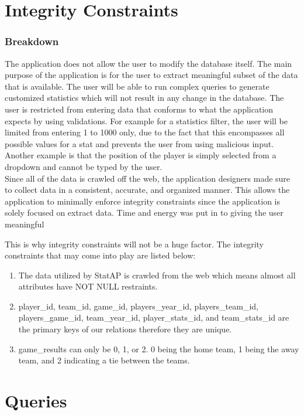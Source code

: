 \documentclass[12pt,letterpaper]{article}
\begin{document}
\section{Integrity Constraints}

\subsubsection{Breakdown}
The application does not allow the user to modify the database itself. The main purpose of the application is for the user to extract meaningful subset of the data that is available. The user will be able to run complex queries to generate customized statistics which will not result in any change in the database. The user is restricted from entering data that conforms to what the application expects by using validations. For example for a statistics filter, the user will be limited from entering 1 to 1000 only, due to the fact that this encompasses all possible values for a stat and prevents the user from using malicious input. Another example is that the position of the player is simply selected from a dropdown and cannot be typed by the user. \\

Since all of the data is crawled off the web, the application designers made sure to collect data in a consistent, accurate, and organized manner. This allows the application to minimally enforce integrity constraints since the application is solely focused on extract data. Time and energy was put in to giving the user meaningful 

This is why integrity constraints will not be a huge factor. The integrity constraints that may come into play are listed below:

\begin{enumerate}
\item The data utilized by StatAP is crawled from the web which means almost all attributes have NOT NULL restraints.
\item player\_id, team\_id, game\_id, players\_year\_id, players\_team\_id, players\_game\_id, team\_year\_id, player\_stats\_id, and team\_stats\_id are the primary keys of our relations therefore they are unique.
\item game\_results can only be 0, 1, or 2. 0 being the home team, 1 being the away team, and 2 indicating a tie between the teams.
\end{enumerate}

\clearpage\null

\section{Queries}
\end{document}
